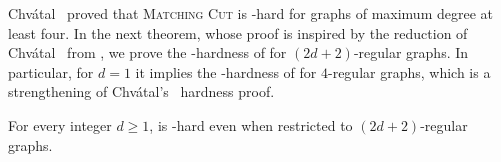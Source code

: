 Chv\'atal~\cite{chvatal_matching_cut} proved that \textsc{Matching Cut} is \NP-hard for graphs of maximum degree at least four. In the next theorem, whose proof is inspired by the reduction of Chv\'atal~\cite{chvatal_matching_cut} from , we prove the \NP-hardness of  for $(2d + 2)$-regular graphs. In particular, for $d=1$ it implies the \NP-hardness of  for $4$-regular graphs, which is a strengthening of Chv\'atal's~\cite{chvatal_matching_cut} hardness proof.


\begin{theorem}
    \label{thm:regular_nph}
    For every integer $d \geq 1$,  is \NP-hard even when restricted to $(2d+2)$-regular graphs.
\end{theorem}

